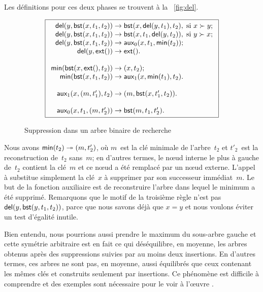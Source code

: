 Les définitions pour ces deux phases se trouvent à la
\fig~\vref{fig:del}.
\begin{figure}[!b]
\begin{equation*}
\boxed{
\begin{array}{r@{\;}l@{\;}l}
  \fun{del}(y,\fun{bst}(x,t_1,t_2)) & \rightarrow &
  \fun{bst}(x,\fun{del}(y,t_1),t_2),\; \text{si \(x \succ y\)};\\
\fun{del}(y,\fun{bst}(x,t_1,t_2)) & \rightarrow &
  \fun{bst}(x,t_1,\fun{del}(y,t_2)),\; \text{si \(y \succ x\)};\\
\fun{del}(y,\fun{bst}(x,t_1,t_2)) & \rightarrow &
   \fun{aux}_0(x,t_1,\fun{min}(t_2));\\
\fun{del}(y,\fun{ext}()) & \rightarrow & \fun{ext}().\\
\\
\fun{min}(\fun{bst}(x,\fun{ext}(),t_2)) & \rightarrow & \pair{x}{t_2};\\
\fun{min}(\fun{bst}(x,t_1,t_2)) & \rightarrow &
  \fun{aux}_1(x,\fun{min}(t_1),t_2).\\
\\
\fun{aux}_1(x,\pair{m}{t'_1},t_2) & \rightarrow &
  \pair{m}{\fun{bst}(x,t'_1,t_2)}.\\
\\
\fun{aux}_0(x,t_1,\pair{m}{t'_2}) & \rightarrow & \fun{bst}(m,t_1,t'_2).
\end{array}}
\end{equation*}
\caption{Suppression dans un arbre binaire de recherche}
\label{fig:del}
\end{figure}
Nous avons \(\textsf{min}(t_2) \twoheadrightarrow
({m},{t'_2})\), où \(m\)~est la clé minimale
de l'arbre~\(t_2\) et \(t'_2\)~est la reconstruction de~\(t_2\)
sans~\(m\); en d'autres termes, le nœud interne le plus à gauche
de~\(t_2\) contient la clé~\(m\) et ce nœud a été remplacé par un
nœud externe. L'appel à  substitue simplement la
clé~\(x\) à supprimer par son successeur immédiat~\(m\). Le but de la
fonction auxiliaire  est de reconstruire l'arbre dans
lequel le minimum a été supprimé. Remarquons que le motif de la
troisième règle n'est pas \(\textsf{del}(y,
\textsf{bst}(y,t_1,t_2))\), parce que nous savons
déjà que \(x=y\) et nous voulons éviter un test d'égalité inutile.

Bien entendu, nous pourrions aussi prendre le maximum du sous-arbre
gauche et cette symétrie arbitraire est en fait ce qui déséquilibre,
en moyenne, les arbres obtenus après des suppressions suivies par au
moins deux insertions. En d'autres termes, ces arbres ne sont pas, en
moyenne, aussi équilibrés que ceux contenant les mêmes clés et
construits seulement par insertions. Ce phénomène est difficile à
comprendre et des exemples sont nécessaire pour le voir à l'œuvre
\citep{Eppinger_1983,CulbersonMunro_1989,CulbersonEvans_1994,Knuth_1998a,Heyer_2009}.

